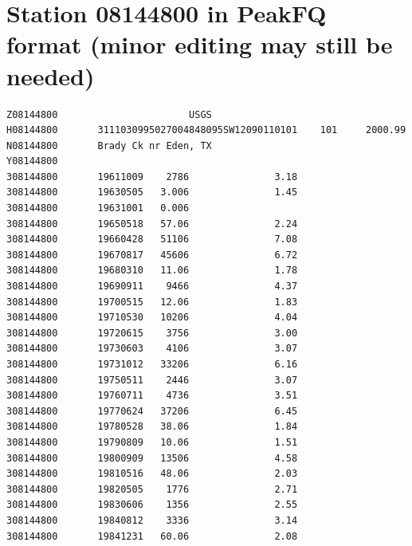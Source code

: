 \documentclass[12pt]{article}
\begin{document}
\section*{\small{Station 08144800 in PeakFQ format (minor editing may still be needed)}}
\begin{verbatim}
Z08144800                       USGS 
H08144800       3111030995027004848095SW12090110101    101     2000.99          
N08144800       Brady Ck nr Eden, TX
Y08144800       
308144800       19611009    2786               3.18                      
308144800       19630505   3.006               1.45                      
308144800       19631001   0.006                                         
308144800       19650518   57.06               2.24                      
308144800       19660428   51106               7.08                      
308144800       19670817   45606               6.72                      
308144800       19680310   11.06               1.78                      
308144800       19690911    9466               4.37                      
308144800       19700515   12.06               1.83                      
308144800       19710530   10206               4.04                      
308144800       19720615    3756               3.00                      
308144800       19730603    4106               3.07                      
308144800       19731012   33206               6.16                      
308144800       19750511    2446               3.07                      
308144800       19760711    4736               3.51                      
308144800       19770624   37206               6.45                      
308144800       19780528   38.06               1.84                      
308144800       19790809   10.06               1.51                      
308144800       19800909   13506               4.58                      
308144800       19810516   48.06               2.03                      
308144800       19820505    1776               2.71                      
308144800       19830606    1356               2.55                      
308144800       19840812    3336               3.14                      
308144800       19841231   60.06               2.08  
\end{verbatim}
\end{document}
